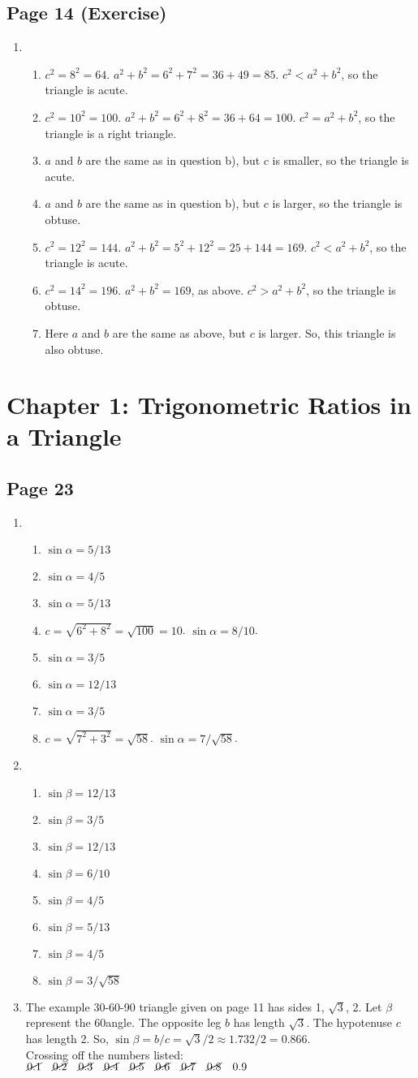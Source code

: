 \documentclass{article}
\newenvironment{solutions}[1]
{\subsection*{#1}
 \begin{enumerate}[leftmargin=1.5em]}
{\end{enumerate}}
\newcommand{\solution}{\item}
\newenvironment{subsolutions}
{\begin{enumerate}}
{\end{enumerate}}
\newcommand{\subsolution}{\item}
\begin{document}
\begin{solutions}{Page 14 (Exercise)}
\solution
\begin{subsolutions}
\subsolution $c^2 = 8^2 = 64$. $a^2 +b^2 = 6^2 + 7^2 = 36 + 49 = 85$. $c^2 < a^2 + b^2$, so the triangle is acute.
\subsolution $c^2 = 10^2 = 100$. $a^2 +b^2 = 6^2 + 8^2 = 36 + 64 = 100$. $c^2 = a^2 + b^2$, so the triangle is a right triangle.
\subsolution $a$ and $b$ are the same as in question b), but $c$ is smaller, so the triangle is acute.
\subsolution $a$ and $b$ are the same as in question b), but $c$ is larger, so the triangle is obtuse.
\subsolution $c^2 = 12^2 = 144$. $a^2 +b^2 = 5^2 + 12^2 = 25 + 144 = 169$. $c^2 < a^2 + b^2$, so the triangle is acute.
\subsolution $c^2 = 14^2 = 196$. $a^2 +b^2 = 169$, as above. $c^2 > a^2 + b^2$, so the triangle is obtuse.
\subsolution Here $a$ and $b$ are the same as above, but $c$ is larger. So, this triangle is also obtuse.
\end{subsolutions}
\end{solutions}


\section*{Chapter 1: Trigonometric Ratios in a Triangle}

\begin{solutions}{Page 23}
\solution %
\begin{subsolutions}
\subsolution $\sin{\alpha} = 5/13$
\subsolution $\sin{\alpha} = 4/5$
\subsolution $\sin{\alpha} = 5/13$
\subsolution $c = \sqrt{6^2 + 8^2} = \sqrt{100} = 10$. $\sin{\alpha} = 8/10$.
\subsolution $\sin{\alpha} = 3/5$
\subsolution $\sin{\alpha} = 12/13$
\subsolution $\sin{\alpha} = 3/5$
\subsolution $c = \sqrt{7^2 + 3^2} = \sqrt{58}$. $\sin{\alpha} = 7/\sqrt{58}$.
\end{subsolutions}

\solution %
\begin{subsolutions}
\subsolution $\sin{\beta} = 12/13$
\subsolution $\sin{\beta} = 3/5$
\subsolution $\sin{\beta} = 12/13$
\subsolution $\sin{\beta} = 6/10$
\subsolution $\sin{\beta} = 4/5$
\subsolution $\sin{\beta} = 5/13$
\subsolution $\sin{\beta} = 4/5$
\subsolution $\sin{\beta} = 3/\sqrt{58}$
\end{subsolutions}

\solution %
The example 30-60-90 triangle given on page 11 has sides 1, $\sqrt{3}$, 2. Let $\beta$ represent the 60\degree angle.
The opposite leg $b$ has length $\sqrt{3}$. The hypotenuse $c$ has length 2. So, $\sin{\beta} = b/c = \sqrt{3}/2 \approx 1.732/2 = 0.866$.\\
\noindent Crossing off the numbers listed:\\
$\cancel{0.1}\quad\cancel{0.2}\quad\cancel{0.3}\quad\cancel{0.4}\quad\cancel{0.5}\quad\cancel{0.6}\quad\cancel{0.7}\quad\cancel{0.8}\quad0.9$

\end{solutions}
\end{document}
